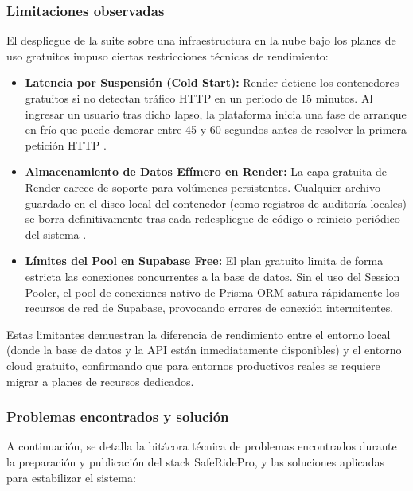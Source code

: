 \documentclass{article}
\begin{document}
\subsubsection{Limitaciones observadas}
El despliegue de la suite sobre una infraestructura en la nube bajo los planes de uso gratuitos impuso ciertas restricciones técnicas de rendimiento:
\begin{itemize}[leftmargin=*]
    \item \textbf{Latencia por Suspensión (Cold Start):} Render detiene los contenedores gratuitos si no detectan tráfico HTTP en un periodo de 15 minutos. Al ingresar un usuario tras dicho lapso, la plataforma inicia una fase de arranque en frío que puede demorar entre 45 y 60 segundos antes de resolver la primera petición HTTP \cite{renderfree}.
    \item \textbf{Almacenamiento de Datos Efímero en Render:} La capa gratuita de Render carece de soporte para volúmenes persistentes. Cualquier archivo guardado en el disco local del contenedor (como registros de auditoría locales) se borra definitivamente tras cada redespliegue de código o reinicio periódico del sistema \cite{renderfree}.
    \item \textbf{Límites del Pool en Supabase Free:} El plan gratuito limita de forma estricta las conexiones concurrentes a la base de datos. Sin el uso del Session Pooler, el pool de conexiones nativo de Prisma ORM satura rápidamente los recursos de red de Supabase, provocando errores de conexión intermitentes.
\end{itemize}

Estas limitantes demuestran la diferencia de rendimiento entre el entorno local (donde la base de datos y la API están inmediatamente disponibles) y el entorno cloud gratuito, confirmando que para entornos productivos reales se requiere migrar a planes de recursos dedicados.

\subsubsection{Problemas encontrados y solución}
A continuación, se detalla la bitácora técnica de problemas encontrados durante la preparación y publicación del stack SafeRidePro, y las soluciones aplicadas para estabilizar el sistema:
\end{document}

